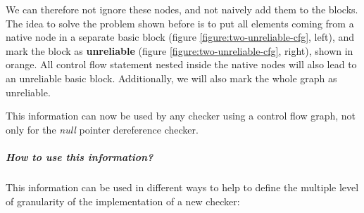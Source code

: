 We can therefore not ignore these nodes, and not naively add them to the blocks.
The idea to solve the problem shown before is to put all elements coming from a native node in a separate basic block (figure \ref{figure:two-unreliable-cfg}, left), and mark the block as \textbf{unreliable} (figure \ref{figure:two-unreliable-cfg}, right), shown in orange.
All control flow statement nested inside the native nodes will also lead to an unreliable basic block.\newline
Additionally, we will also mark the whole graph as unreliable. 

This information can now be used by any checker using a control flow graph, not only for the \emph{null} pointer dereference checker.

\subparagraph{How to use this information?}
\label{subsubsec:use_unreliable_information}

This information can be used in different ways to help to define the multiple level of granularity of the implementation of a new checker:

